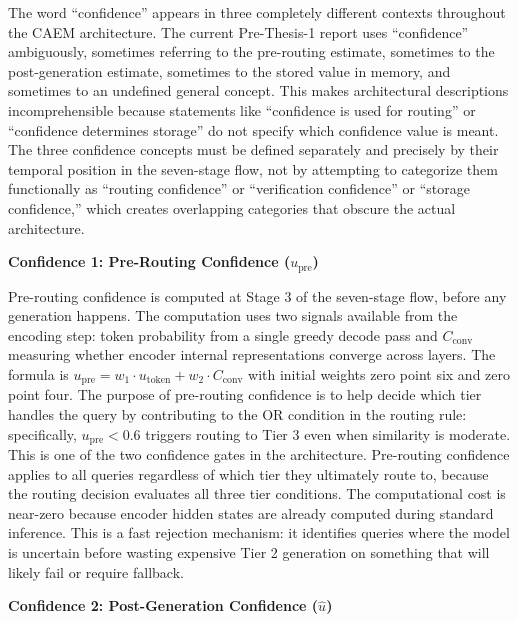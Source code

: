 \documentclass[11pt,a4paper]{article}
\newcommand{\architecturebox}[2]{%
\begin{tcolorbox}[enhanced,breakable,
  colback=LightTeal,colframe=Teal,boxrule=1.5pt,arc=4pt,
  left=8pt,right=8pt,top=6pt,bottom=6pt,
  title={\bfseries\small\color{white}#1},
  attach boxed title to top left={yshift=-2mm,xshift=6mm},
  boxed title style={colback=Teal,arc=3pt,boxrule=0pt,
    left=4pt,right=4pt,top=2pt,bottom=2pt}]
#2
\end{tcolorbox}}
\newcommand{\Cconv}{C_{\text{conv}}}
\newcommand{\uhat}{\hat{u}}
\newcommand{\upre}{u_{\text{pre}}}
\begin{document}
\architecturebox{ARCHITECTURE UPDATE 4: Three Distinct Confidence Concepts Defined by Temporal Position}{
The word ``confidence'' appears in three completely different contexts throughout the CAEM architecture. The current Pre-Thesis-1 report uses ``confidence'' ambiguously, sometimes referring to the pre-routing estimate, sometimes to the post-generation estimate, sometimes to the stored value in memory, and sometimes to an undefined general concept. This makes architectural descriptions incomprehensible because statements like ``confidence is used for routing'' or ``confidence determines storage'' do not specify which confidence value is meant. The three confidence concepts must be defined separately and precisely by their temporal position in the seven-stage flow, not by attempting to categorize them functionally as ``routing confidence'' or ``verification confidence'' or ``storage confidence,'' which creates overlapping categories that obscure the actual architecture.

\textbf{Confidence 1: Pre-Routing Confidence ($\upre$)}

Pre-routing confidence is computed at Stage 3 of the seven-stage flow, before any generation happens. The computation uses two signals available from the encoding step: token probability from a single greedy decode pass and $\Cconv$ measuring whether encoder internal representations converge across layers. The formula is $\upre = w_1 \cdot u_{\text{token}} + w_2 \cdot \Cconv$ with initial weights zero point six and zero point four. The purpose of pre-routing confidence is to help decide which tier handles the query by contributing to the OR condition in the routing rule: specifically, $\upre < 0.6$ triggers routing to Tier 3 even when similarity is moderate. This is one of the two confidence gates in the architecture. Pre-routing confidence applies to all queries regardless of which tier they ultimately route to, because the routing decision evaluates all three tier conditions. The computational cost is near-zero because encoder hidden states are already computed during standard inference. This is a fast rejection mechanism: it identifies queries where the model is uncertain before wasting expensive Tier 2 generation on something that will likely fail or require fallback.

\textbf{Confidence 2: Post-Generation Confidence ($\uhat$)}

}
\end{document}
